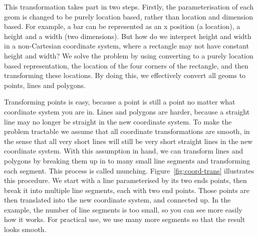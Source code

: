 This transformation takes part in two steps.  Firstly, the parameterisation of each geom is changed to be purely location based, rather than location and dimension based.  For example, a bar can be represented as an x position (a location), a height and a width (two dimensions).  But how do we interpret height and width in a non-Cartesian coordinate system, where a rectangle may not have constant height and width?  We solve the problem by using converting to a purely location based representation, the location of the four corners of the rectangle, and then transforming these locations.  By doing this, we effectively convert all geoms to points, lines and polygons.  

Transforming points is easy, because a point is still a point no matter what coordinate system you are in.  Lines and polygons are harder, because a straight line may no longer be straight in the new coordinate system.  To make the problem tractable we assume that all coordinate transformations are smooth, in the sense that all very short lines will still be very short straight lines in the new coordinate system.  With this assumption in hand, we can transform lines and polygons by breaking them up in to many small line segments and transforming each segment. This process is called munching.  Figure~\ref{fig:coord-trans} illustrates this procedure.  We start with a line parameterised by its two ends points, then break it into multiple line segments, each with two end points.  Those points are then translated into the new coordinate system, and connected up.  In the example, the number of line segments is too small, so you can see more easily how it works.  For practical use, we use many more segments so that the result looks smooth.

% 
%
% 


